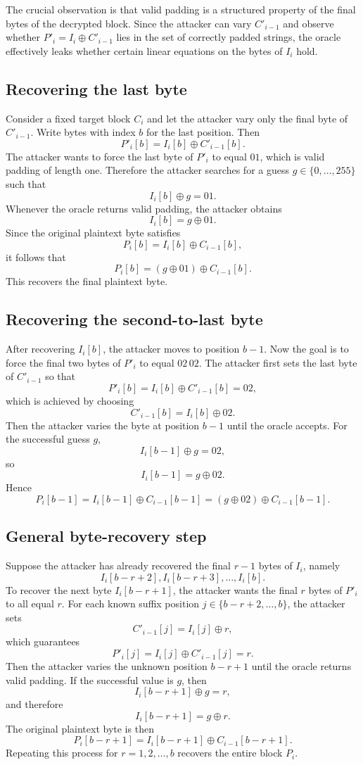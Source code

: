 The crucial observation is that valid padding is a structured property of the final bytes of the decrypted block. Since the attacker can vary $C'_{i-1}$ and observe whether $P'_i = I_i \oplus C'_{i-1}$ lies in the set of correctly padded strings, the oracle effectively leaks whether certain linear equations on the bytes of $I_i$ hold.

\subsection{Recovering the last byte}

Consider a fixed target block $C_i$ and let the attacker vary only the final byte of $C'_{i-1}$. Write bytes with index $b$ for the last position. Then
\[
P'_i[b] = I_i[b] \oplus C'_{i-1}[b].
\]
The attacker wants to force the last byte of $P'_i$ to equal $01$, which is valid padding of length one. Therefore the attacker searches for a guess $g \in \{0,\dots,255\}$ such that
\[
I_i[b] \oplus g = 01.
\]
Whenever the oracle returns valid padding, the attacker obtains
\[
I_i[b] = g \oplus 01.
\]
Since the original plaintext byte satisfies
\[
P_i[b] = I_i[b] \oplus C_{i-1}[b],
\]
it follows that
\[
P_i[b] = (g \oplus 01) \oplus C_{i-1}[b].
\]
This recovers the final plaintext byte.

\subsection{Recovering the second-to-last byte}

After recovering $I_i[b]$, the attacker moves to position $b-1$. Now the goal is to force the final two bytes of $P'_i$ to equal $02\,02$. The attacker first sets the last byte of $C'_{i-1}$ so that
\[
P'_i[b] = I_i[b] \oplus C'_{i-1}[b] = 02,
\]
which is achieved by choosing
\[
C'_{i-1}[b] = I_i[b] \oplus 02.
\]
Then the attacker varies the byte at position $b-1$ until the oracle accepts. For the successful guess $g$,
\[
I_i[b-1] \oplus g = 02,
\]
so
\[
I_i[b-1] = g \oplus 02.
\]
Hence
\[
P_i[b-1] = I_i[b-1] \oplus C_{i-1}[b-1] = (g \oplus 02) \oplus C_{i-1}[b-1].
\]

\subsection{General byte-recovery step}

Suppose the attacker has already recovered the final $r-1$ bytes of $I_i$, namely
\[
I_i[b-r+2], I_i[b-r+3], \dots, I_i[b].
\]
To recover the next byte $I_i[b-r+1]$, the attacker wants the final $r$ bytes of $P'_i$ to all equal $r$. For each known suffix position $j \in \{b-r+2,\dots,b\}$, the attacker sets
\[
C'_{i-1}[j] = I_i[j] \oplus r,
\]
which guarantees
\[
P'_i[j] = I_i[j] \oplus C'_{i-1}[j] = r.
\]
Then the attacker varies the unknown position $b-r+1$ until the oracle returns valid padding. If the successful value is $g$, then
\[
I_i[b-r+1] \oplus g = r,
\]
and therefore
\[
I_i[b-r+1] = g \oplus r.
\]
The original plaintext byte is then
\[
P_i[b-r+1] = I_i[b-r+1] \oplus C_{i-1}[b-r+1].
\]
Repeating this process for $r=1,2,\dots,b$ recovers the entire block $P_i$.

